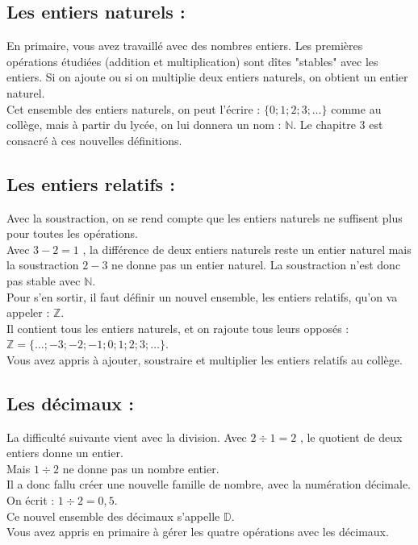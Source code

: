 \documentclass[nocrop]{sesamanuel_guyon}
\begin{document}
\bigskip


	\begin{debat}
\subsection*{Les entiers naturels :}		En primaire, vous avez travaillé avec des nombres entiers. Les premières opérations étudiées (addition et multiplication) sont dîtes "stables" avec les entiers.
		Si on ajoute ou si on multiplie deux entiers naturels, on obtient un entier naturel.\\
		Cet ensemble des entiers naturels, on peut l'écrire : $\big\{0;1;2;3;\ldots \big\}$ comme au collège, mais à partir du lycée, on lui donnera un nom : $\mathbb {N}$. Le chapitre 3 est consacré à ces nouvelles définitions.\\
\subsection*{Les entiers relatifs :}	
Avec la soustraction, 	on se rend compte que les entiers naturels ne suffisent plus pour toutes les opérations.\\
Avec $3-2=1$ , la différence de deux entiers naturels reste un entier naturel
mais la soustraction $2-3$ ne donne pas un entier naturel.
La soustraction n'est donc pas stable avec $\mathbb {N}$.\\
Pour s'en sortir, il faut définir un nouvel ensemble, les entiers relatifs, qu'on va appeler : $\mathbb {Z}$.\\
Il contient tous les entiers naturels, et on rajoute tous leurs opposés : $\mathbb {Z}=\{\ldots ; -3;-2;-1;0;1;2;3; \ldots\}$.\\
Vous avez appris à ajouter, soustraire et multiplier les entiers relatifs au collège.\\
\subsection*{Les décimaux :}		
La difficulté suivante vient avec la division. Avec $2 \div 1=2$ , le quotient de deux entiers donne un entier.\\
Mais $1 \div 2$ ne donne pas un nombre entier.\\
Il a donc fallu créer une nouvelle famille de nombre, avec la numération décimale. On écrit : $1 \div 2 = 0,5$.\\
Ce nouvel ensemble des décimaux  s'appelle $\mathbb{D}$.\\
Vous avez appris en primaire à gérer les quatre opérations avec les décimaux.\\

\end{debat}
\end{document}
